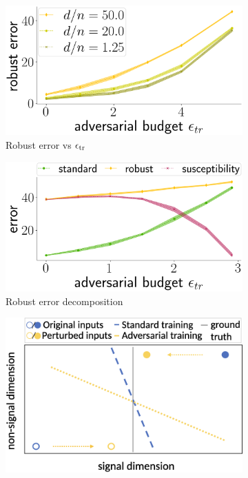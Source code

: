 \begin{figure}[!t]
\centering
\begin{subfigure}[b]{0.32\textwidth}
  \includegraphics[width=0.99\linewidth]{plotsAistats/d_n_logreg.png}
  \caption{Robust error vs $\epsilon_{\text{tr}}$}
  \label{fig:eps_logreg}
\end{subfigure}
\begin{subfigure}[b]{0.32\textwidth}
  \includegraphics[width=0.99\linewidth]{plotsAistats/logreg_trade_off_plot.png}
  \caption{Robust error decomposition}
  \label{fig:main_robust}
\end{subfigure}
\begin{subfigure}[b]{0.32\textwidth}
  \includegraphics[width=0.99\linewidth]{plotsAistats/linear_intuition_try.png}

\end{subfigure}
\end{figure}
